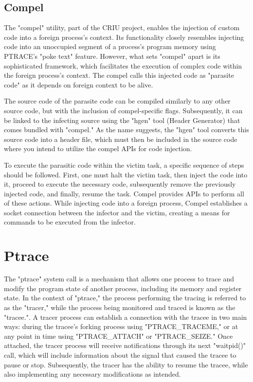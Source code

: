 \documentclass[article, doublespace,nopageskip]{VTthesis} %
\begin{document}
    \subsection{Compel} \label{ase: Compel}
    The "compel" utility, part of the CRIU project, enables the injection of custom code into a foreign process's context. Its functionality closely resembles injecting code into an unoccupied segment of a process's program memory using PTRACE's "poke text" feature. However, what sets "compel" apart is its sophisticated framework, which facilitates the execution of complex code within the foreign process's context. The compel calls this injected code as "parasite code" as it depends on foreign context to be alive. 

    The source code of the parasite code can be compiled similarly to any other source code, but with the inclusion of compel-specific flags. Subsequently, it can be linked to the infecting source using the "hgen" tool (Header Generator) that comes bundled with "compel." As the name suggests, the "hgen" tool converts this source code into a header file, which must then be included in the source code where you intend to utilize the compel APIs for code injection.

    To execute the parasitic code within the victim task, a specific sequence of steps should be followed. First, one must halt the victim task, then inject the code into it, proceed to execute the necessary code, subsequently remove the previously injected code, and finally, resume the task. Compel provides APIs to perform all of these actions. While injecting code into a foreign process, Compel establishes a socket connection between the infector and the victim, creating a means for commands to be executed from the infector. 

     \section{Ptrace} \label{ss:Ptrace}
     The "ptrace" system call is a mechanism that allows one process to trace and modify the program state of another process, including its memory and register state. In the context of "ptrace," the process performing the tracing is referred to as the "tracer," while the process being monitored and traced is known as the "tracee.". A tracer process can establish a connection with the tracee in two main ways: during the tracee's forking process using "PTRACE\_TRACEME," or at any point in time using "PTRACE\_ATTACH" or "PTRACE\_SEIZE." Once attached, the tracer process will receive notifications through its next "waitpid()" call, which will include information about the signal that caused the tracee to pause or stop. Subsequently, the tracer has the ability to resume the tracee, while also implementing any necessary modifications as intended.
\end{document}
